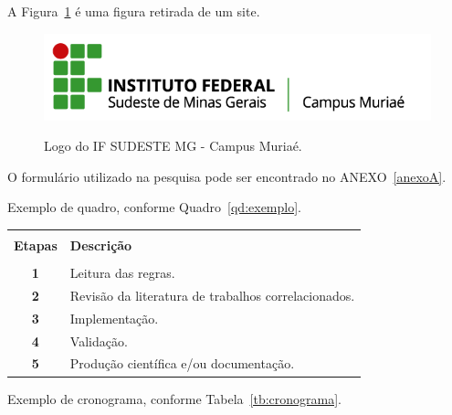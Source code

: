 A Figura~\ref{fig:ifmg} é uma figura retirada de um site.

\begin{figure}[H] %
   \begin{center}
    \caption{Logo do IF SUDESTE MG - Campus Muriaé.} %
    \label{fig:ifmg}
    \includegraphics[width=0.5\linewidth]{Figuras/logoifsudestemg.png} \\
    \end{center}    
    
\end{figure}




O formulário utilizado na pesquisa pode ser encontrado no ANEXO~\ref{anexoA}.

Exemplo de quadro, conforme Quadro~\ref{qd:exemplo}.

\begin{quadro}[htb]
  \centering
  \caption{Exemplo de quadro.}\label{qd:exemplo}
  \begin{tabular}{cp{12cm}}
    \hline \hline &\\[-0.4cm]
    \textbf{Etapas} & \textbf{Descrição} \\
    \hline
    &\\[-0.4cm]
    \textbf{1} & Leitura das regras. \\[0.2cm]
    \textbf{2} & Revisão da literatura de trabalhos correlacionados. \\[0.2cm]
    \textbf{3}& Implementação.\\[0.2cm]
    \textbf{4} & Validação. \\[0.2cm]
    \textbf{5} & Produção científica e/ou documentação.\\[0.2cm]
    \hline \hline
  \end{tabular}
\end{quadro}


Exemplo de cronograma, conforme Tabela~\ref{tb:cronograma}.

